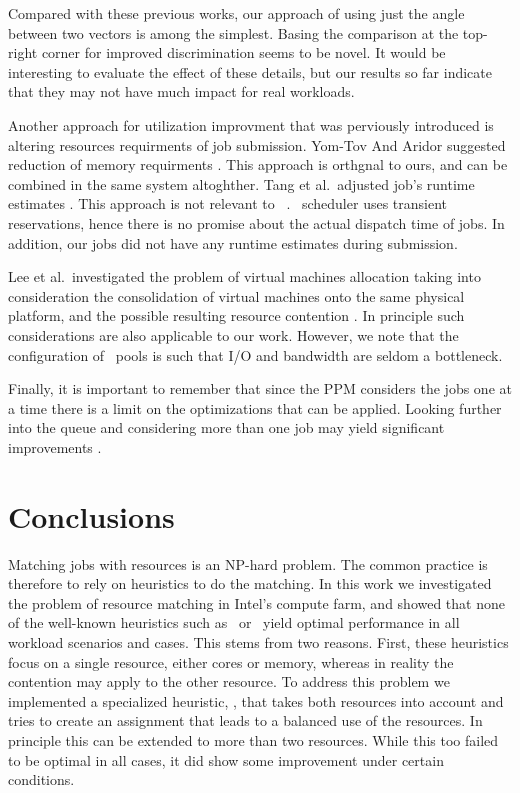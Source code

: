 Compared with these previous works, our approach of using just the
angle between two vectors is among the simplest.
Basing the comparison at the top-right corner for improved
discrimination seems to be novel.
It would be interesting to evaluate the effect of these details, but
our results so far indicate that they may not have much impact for
real workloads.

Another approach for utilization improvment that was perviously introduced 
is altering resources requirments of job submission. 
Yom-Tov And Aridor suggested reduction of memory requirments \cite{yomtov2008}. 
This approach is orthgnal to ours, and can be combined in the same system altoghther.
Tang et al.\ adjusted job's runtime estimates \cite{Tang2010}. 
This approach is not relevant to \nb\ . 
\nb\ scheduler uses transient reservations, hence there is no promise about the actual dispatch 
time of jobs. In addition, our jobs did not have any runtime estimates during submission.

Lee et al.\ investigated the problem of virtual machines allocation
taking into consideration the consolidation of virtual machines onto
the same physical platform, and the possible resulting resource
contention \cite{sangmin}.
In principle such considerations are also applicable to our work.
However, we note that the configuration of \nb\ pools is such that I/O
and bandwidth are seldom a bottleneck.

Finally, it is important to remember that since the PPM considers 
the jobs one at a time
there is a limit on the optimizations that can be applied. 
Looking further into the queue and considering more than one job 
may yield significant improvements \cite{Shmueli05backfillingwith}.


\chapter{Conclusions}
\label{sec:conclusions}

Matching jobs with resources is an NP-hard problem.
The common practice is therefore to rely on heuristics to do the
matching.
In this work we investigated the problem of resource matching in
Intel's compute farm, and showed that none of the well-known
heuristics such as \bef\ or \wof\ yield optimal performance in
all workload scenarios and cases.
This stems from two reasons.
First, these heuristics focus on a single resource, either cores or
memory, whereas in reality the contention may apply to the other
resource.
To address this problem we implemented a specialized heuristic, \mif,
that takes both resources into account and tries to create an
assignment that leads to a balanced use of the resources.
In principle this can be extended to more than two resources.
While this too failed to be optimal in all cases, it did show some
improvement under certain conditions.

